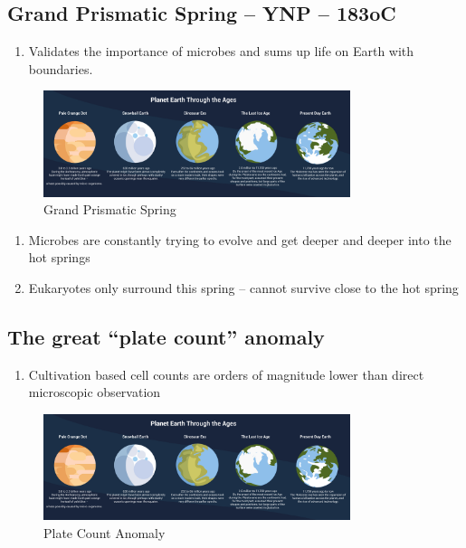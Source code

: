 \documentclass[
]{book}
\providecommand{\tightlist}{%
  \setlength{\itemsep}{0pt}\setlength{\parskip}{0pt}}
\begin{document}
\hypertarget{grand-prismatic-spring-ynp-183oc}{%
\subsection*{Grand Prismatic Spring -- YNP -- 183oC}\label{grand-prismatic-spring-ynp-183oc}}

\begin{enumerate}
\def\labelenumi{\arabic{enumi}.}
\tightlist
\item
  Validates the importance of microbes and sums up life on Earth with boundaries.
\end{enumerate}

\begin{figure}
\centering
\includegraphics[width=0.8\textwidth,height=\textheight]{./Figures/Planets.png}
\caption{Grand Prismatic Spring}
\end{figure}

\begin{enumerate}
\def\labelenumi{\arabic{enumi}.}
\setcounter{enumi}{1}
\item
  Microbes are constantly trying to evolve and get deeper and deeper into the hot springs
\item
  Eukaryotes only surround this spring -- cannot survive close to the hot spring
\end{enumerate}

\hypertarget{the-great-plate-count-anomaly}{%
\subsection{The great ``plate count'' anomaly}\label{the-great-plate-count-anomaly}}

\begin{enumerate}
\def\labelenumi{\arabic{enumi}.}
\tightlist
\item
  Cultivation based cell counts are orders of magnitude lower than direct microscopic observation
\end{enumerate}

\begin{figure}
\centering
\includegraphics[width=0.8\textwidth,height=\textheight]{./Figures/Planets.png}
\caption{Plate Count Anomaly}
\end{figure}
\end{document}
